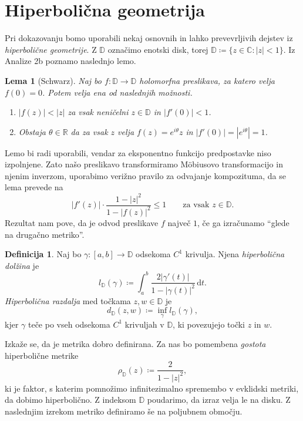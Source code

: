 \documentclass[a4paper, oneside]{amsart}
\newcommand{\RR}{\mathbb{R}}
\newcommand{\CC}{\mathbb{C}}
\newcommand{\DD}{\mathbb{D}}
\newcommand{\dd}[1]{\, \mathrm{d} #1}
\theoremstyle{plain}
\newtheorem{lemma}[theorem]{Lema}
\theoremstyle{definition}
\newtheorem{definition}[theorem]{Definicija}
\begin{document}
\section{Hiperbolična geometrija}
\noindent Pri dokazovanju bomo uporabili nekaj osnovnih in lahko prevevrljivih
dejstev iz \emph{hiperbolične geometrije}. Z \(\DD\) označimo enotski disk,
torej \(\DD \coloneq \{ z \in \CC : |z| < 1 \}\). Iz Analize 2b poznamo naslednjo
lemo.

\begin{lemma}[Schwarz]
    Naj bo \(f \colon \DD \to \DD\) holomorfna preslikava, za katero velja
    \(f (0) = 0\). Potem velja ena od naslednjih možnosti.
        \begin{enumerate}
            \item \(|f (z)| < |z|\) za vsak neničelni \(z \in \DD\) in \(|f' (0)| < 1\).
            \item Obstaja \(\theta \in \RR\) da za vsak \(z\) velja
                \(f (z) = e^{i \theta} z\) in \(|f' (0)| = |e^{i \theta}| = 1\).
        \end{enumerate}
\end{lemma}

Lemo bi radi uporabili, vendar za eksponentno funkcijo predpostavke niso
izpolnjene. Zato našo preslikavo transformiramo M\"obiusovo transformacijo in
njenim inverzom, uporabimo verižno pravilo za odvajanje kompozituma, da se lema
prevede na
\[|f' (z)| \cdot \frac{1 - |z|^2}{1 - |f (z)|^2} \leq 1 \qquad \text{za vsak } z \in \DD.\]
Rezultat nam pove, da je odvod preslikave \(f\) največ \(1\), če ga izračunamo
``glede na drugačno metriko''.


\begin{definition}
    Naj bo \(\gamma \colon [a, b] \to \DD\) odsekoma \(C^1\) krivulja. Njena
    \emph{hiperbolična dolžina} je
    \[l_{\DD} (\gamma) \coloneq \int_{a}^{b} \frac{2 |\gamma' (t)|}{1 - |\gamma (t)|^2} \dd{t}.\]
    \emph{Hiperbolična razdalja} med točkama \(z, w \in \DD\) je
    \[d_{\DD} (z, w) \coloneq \inf_{\gamma} l_{\DD} (\gamma),\]
    kjer \(\gamma\) teče po vseh odsekoma \(C^1\) krivuljah v \(\DD\), ki
    povezujejo točki \(z\) in \(w\).
\end{definition}

Izkaže se, da je metrika dobro definirana. Za nas bo pomembena \emph{gostota}
hiperbolične metrike
\[\rho_{\DD} (z) \coloneq \frac{2}{1 - |z|^2},\]
ki je faktor, s katerim pomnožimo infinitezimalno spremembo v evklidski metriki,
da dobimo hiperbolično. Z indeksom \(\DD\) poudarimo, da izraz velja le na disku.
Z naslednjim izrekom metriko definiramo še na poljubnem območju.
\end{document}
